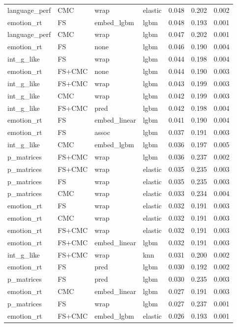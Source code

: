 \documentclass{article}
\begin{document}
\begin{longtable}{llllrrr}
	language\_perf & CMC & wrap & elastic & 0.048 & 0.202 & 0.002 \\
	emotion\_rt & FS & embed\_lgbm & lgbm & 0.048 & 0.193 & 0.001 \\
	language\_perf & CMC & wrap & lgbm & 0.047 & 0.202 & 0.001 \\
	emotion\_rt & FS & none & lgbm & 0.046 & 0.190 & 0.004 \\
	int\_g\_like & FS & wrap & lgbm & 0.044 & 0.198 & 0.004 \\
	emotion\_rt & FS+CMC & none & lgbm & 0.044 & 0.190 & 0.003 \\
	int\_g\_like & FS+CMC & wrap & lgbm & 0.043 & 0.199 & 0.003 \\
	int\_g\_like & CMC & wrap & lgbm & 0.042 & 0.199 & 0.003 \\
	int\_g\_like & FS+CMC & pred & lgbm & 0.042 & 0.198 & 0.004 \\
	emotion\_rt & FS & embed\_linear & lgbm & 0.041 & 0.190 & 0.004 \\
	emotion\_rt & FS & assoc & lgbm & 0.037 & 0.191 & 0.003 \\
	int\_g\_like & CMC & embed\_lgbm & lgbm & 0.036 & 0.197 & 0.005 \\
	p\_matrices & FS+CMC & wrap & lgbm & 0.036 & 0.237 & 0.002 \\
	p\_matrices & FS+CMC & wrap & elastic & 0.035 & 0.235 & 0.003 \\
	p\_matrices & FS & wrap & elastic & 0.035 & 0.235 & 0.003 \\
	p\_matrices & CMC & wrap & elastic & 0.033 & 0.234 & 0.004 \\
	emotion\_rt & FS & wrap & elastic & 0.032 & 0.191 & 0.003 \\
	emotion\_rt & CMC & wrap & elastic & 0.032 & 0.191 & 0.003 \\
	emotion\_rt & FS+CMC & wrap & elastic & 0.032 & 0.191 & 0.003 \\
	emotion\_rt & FS+CMC & embed\_linear & lgbm & 0.032 & 0.191 & 0.003 \\
	int\_g\_like & FS+CMC & wrap & knn & 0.031 & 0.200 & 0.002 \\
	emotion\_rt & FS & pred & lgbm & 0.030 & 0.192 & 0.002 \\
	p\_matrices & FS & pred & lgbm & 0.030 & 0.235 & 0.003 \\
	emotion\_rt & CMC & embed\_linear & lgbm & 0.027 & 0.191 & 0.003 \\
	p\_matrices & FS & wrap & lgbm & 0.027 & 0.237 & 0.001 \\
	emotion\_rt & FS+CMC & embed\_lgbm & elastic & 0.026 & 0.193 & 0.001 \\

\end{longtable}
\end{document}
